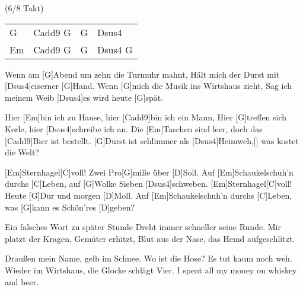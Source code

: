 
{ \footnotesize (6/8 Takt)}

\begin{guitar}
		{\footnotesize\begin{tabular}{l|l|l|l}
			G & Cadd9 G & G & Dsus4 \\
			Em & Cadd9 G & G & Dsus4 G 
	\end{tabular}}\vspace{-0.1em}
	
	Wenn am [G]Abend um zehn die Turmuhr mahnt,
	Hält mich der Durst mit [Dsus4]eiserner [G]Hand.
	Wenn [G]mich die Musik ins Wirtshaus zieht,
	Sag ich meinem Weib [Dsus4]es wird heute [G]spät.\vspace{-0.1em}
	
	Hier [Em]bin ich zu Hause, hier [Cadd9]bin ich ein Mann,
	Hier [G]treffen sich Kerle, hier [Dsus4]schreibe ich an.
	Die [Em]Taschen sind leer, doch das [Cadd9]Bier ist bestellt.
	[G]Durst ist schlimmer als [Dsus4]Heimweh,[]{ was} kostet die Welt?\vspace{-0.1em}
	
	[Em]Sternhagel[C]voll! Zwei Pro[G]mille über [D]Soll.
	Auf [Em]Schaukelschuh'n durchs [C]Leben, auf [G]Wolke Sieben [Dsus4]schweben.
	[Em]Sternhagel[C]voll! Heute [G]Dur und morgen [D]Moll.
	Auf [Em]Schaukelschuh'n durchs [C]Leben, was [G]kann es Schön'res [D]geben?\vspace{-0.1em}
	
	\vspace{-0.1em}
	
	Ein falsches Wort zu später Stunde
	Dreht immer schneller seine Runde.
	Mir platzt der Kragen, Gemüter erhitzt,
	Blut aus der Nase, das Hemd aufgeschlitzt.\vspace{-0.1em}

	Draußen mein Name, gelb im Schnee.
	Wo ist die Hose? Es tut kaum noch weh.
	Wieder im Wirtshaus, die Glocke schlägt Vier.
	I spent all my money on whiskey and beer.\vspace{-0.1em}
	
	 \vspace{-0.1em}
	
	\vspace{-0.1em}
	
	 \hfill\end{guitar}